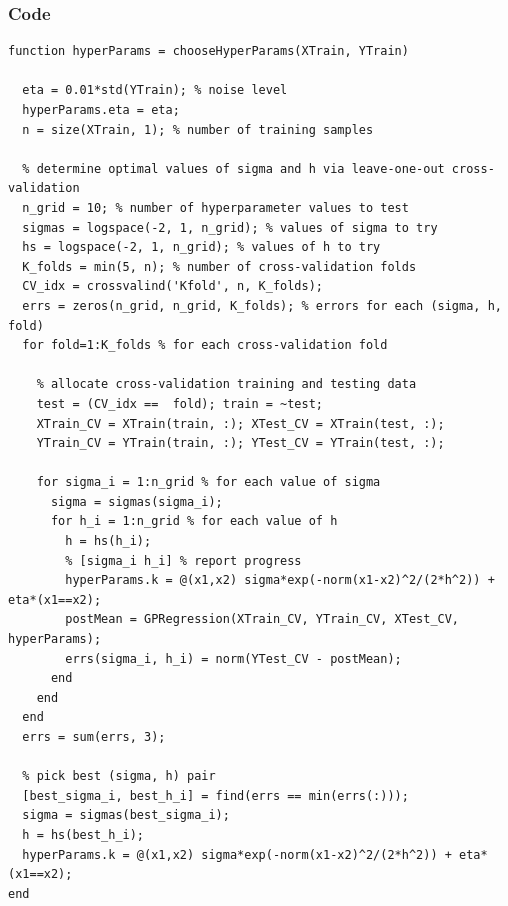 \documentclass[11pt]{article}
\begin{document}
\subsubsection*{Code}
\begin{verbatim}
function hyperParams = chooseHyperParams(XTrain, YTrain)

  eta = 0.01*std(YTrain); % noise level
  hyperParams.eta = eta;
  n = size(XTrain, 1); % number of training samples

  % determine optimal values of sigma and h via leave-one-out cross-validation
  n_grid = 10; % number of hyperparameter values to test
  sigmas = logspace(-2, 1, n_grid); % values of sigma to try
  hs = logspace(-2, 1, n_grid); % values of h to try
  K_folds = min(5, n); % number of cross-validation folds
  CV_idx = crossvalind('Kfold', n, K_folds);
  errs = zeros(n_grid, n_grid, K_folds); % errors for each (sigma, h, fold)
  for fold=1:K_folds % for each cross-validation fold

    % allocate cross-validation training and testing data
    test = (CV_idx ==  fold); train = ~test;
    XTrain_CV = XTrain(train, :); XTest_CV = XTrain(test, :);
    YTrain_CV = YTrain(train, :); YTest_CV = YTrain(test, :);

    for sigma_i = 1:n_grid % for each value of sigma
      sigma = sigmas(sigma_i);
      for h_i = 1:n_grid % for each value of h
        h = hs(h_i);
        % [sigma_i h_i] % report progress
        hyperParams.k = @(x1,x2) sigma*exp(-norm(x1-x2)^2/(2*h^2)) + eta*(x1==x2);
        postMean = GPRegression(XTrain_CV, YTrain_CV, XTest_CV, hyperParams);
        errs(sigma_i, h_i) = norm(YTest_CV - postMean);
      end
    end
  end
  errs = sum(errs, 3);

  % pick best (sigma, h) pair
  [best_sigma_i, best_h_i] = find(errs == min(errs(:)));
  sigma = sigmas(best_sigma_i);
  h = hs(best_h_i);
  hyperParams.k = @(x1,x2) sigma*exp(-norm(x1-x2)^2/(2*h^2)) + eta*(x1==x2);
end
\end{verbatim}
\newpage
\end{document}
